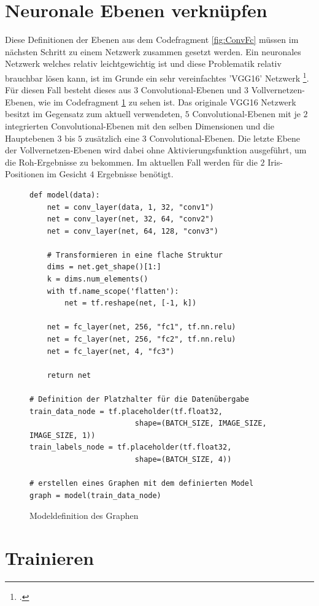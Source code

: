 \section{Neuronale Ebenen verknüpfen}

Diese Definitionen der Ebenen aus dem Codefragment \ref{fig:ConvFc} müssen im nächsten Schritt zu einem Netzwerk zusammen gesetzt werden. 
Ein neuronales Netzwerk welches relativ leichtgewichtig ist und diese Problematik relativ brauchbar lösen kann, ist im Grunde ein sehr vereinfachtes 'VGG16' Netzwerk \footcite{VGG16: TODO}.
Für diesen Fall besteht dieses aus $3$ Convolutional-Ebenen und $3$ Vollvernetzen-Ebenen, wie im Codefragment \ref{fig:buildGraph} zu sehen ist. 
Das originale VGG16 Netzwerk besitzt im Gegensatz zum aktuell verwendeten, $5$ Convolutional-Ebenen mit je $2$ integrierten Convolutional-Ebenen mit den selben Dimensionen und die Hauptebenen $3$ bis $5$ zusätzlich eine $3$ Convolutional-Ebenen. 
Die letzte Ebene der Vollvernetzen-Ebenen wird dabei ohne Aktivierungsfunktion ausgeführt, um die Roh-Ergebnisse zu bekommen. 
Im aktuellen Fall werden für die $2$ Iris-Positionen im Gesicht $4$ Ergebnisse benötigt. 
\begin{figure}[ht!]
\lstset{language=Python}
\begin{lstlisting}
def model(data):
    net = conv_layer(data, 1, 32, "conv1")
    net = conv_layer(net, 32, 64, "conv2")
    net = conv_layer(net, 64, 128, "conv3")

    # Transformieren in eine flache Struktur
    dims = net.get_shape()[1:]
    k = dims.num_elements()
    with tf.name_scope('flatten'):
        net = tf.reshape(net, [-1, k])
    
    net = fc_layer(net, 256, "fc1", tf.nn.relu)    
    net = fc_layer(net, 256, "fc2", tf.nn.relu)
    net = fc_layer(net, 4, "fc3")
    
    return net
    
# Definition der Platzhalter für die Datenübergabe
train_data_node = tf.placeholder(tf.float32, 
						shape=(BATCH_SIZE, IMAGE_SIZE, IMAGE_SIZE, 1))
train_labels_node = tf.placeholder(tf.float32, 
						shape=(BATCH_SIZE, 4))

# erstellen eines Graphen mit dem definierten Model
graph = model(train_data_node)
\end{lstlisting}
	\caption{Modeldefinition des Graphen}
	\label{fig:buildGraph}
\end{figure}

\section{Trainieren}

